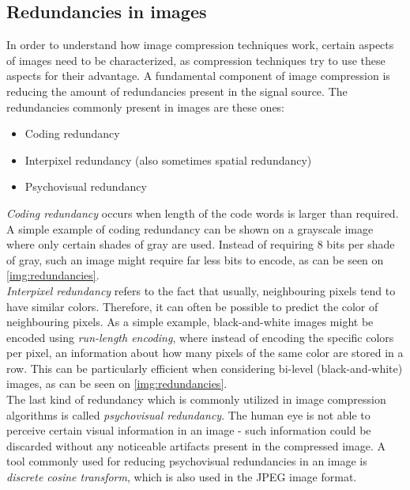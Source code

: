 \documentclass[thesis=M,english]{FITthesis}[2012/10/20]
\begin{document}
\subsection{Redundancies in images}
\label{sec:imgcmpr-redund}
In order to understand how image compression techniques work, certain aspects of
images need to be characterized, as compression techniques try to use these
aspects for their advantage. A fundamental component of image compression is
reducing the amount of redundancies present in the signal source. The redundancies
commonly present in images are these ones:

\begin{itemize}
  \item Coding redundancy
  \item Interpixel redundancy (also sometimes spatial redundancy)
  \item Psychovisual redundancy
\end{itemize}
\cite{fromdcttowavelet}

\emph{Coding redundancy} occurs when length of the code words is larger than
required. A simple example of coding redundancy can be shown on a grayscale
image where only certain shades of gray are used. Instead of requiring
8 bits per shade of gray, such an image might require far less bits to
encode, as can be seen on \ref{img:redundancies}.
\\

\emph{Interpixel redundancy} refers to the fact that usually, neighbouring pixels
tend to have similar colors. Therefore, it can often be possible to predict
the color of neighbouring pixels. As a simple example, black-and-white images
might be encoded using \emph{run-length encoding}, where instead of 
encoding the specific colors per pixel, an information about how many
pixels of the same color are stored in a row. This can be particularly
efficient when considering bi-level (black-and-white) images, as can be seen
on \ref{img:redundancies}.
\\

The last kind of redundancy which is commonly utilized in image compression
algorithms is called \emph{psychovisual redundancy}. The human eye is not
able to perceive certain visual information in an image - such information could
be discarded without any noticeable artifacts present in the compressed image.
A tool commonly used for reducing psychovisual redundancies in an image is
\emph{discrete cosine transform}, which is also used in the JPEG image
format.
\end{document}
